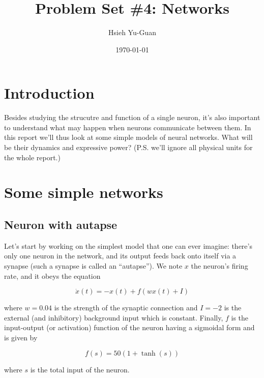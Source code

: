 

\pagestyle{fancy} 
\rfoot{\thepage}
\cfoot{}
\lfoot{~\theauthor}
\renewcommand{\headrulewidth}{0.4pt}
\renewcommand{\footrulewidth}{0.4pt}


\title{Problem Set \#4: Networks \vspace{-0.5em}}
\author{Hsieh Yu-Guan}
\date{\today}
\maketitle

\thispagestyle{fancy}

\section*{Introduction}

Besides studying the strucutre and function of a single neuron, it's also
important to understand what may happen when neurons communicate between them.
In this report we'll thus look at some simple models of neural networks.
What will be their dynamics and expressive power? 
(P.S. we'll ignore all physical units for the whole report.)

\section{Some simple networks}

\subsection{Neuron with autapse}

Let's start by working on the simplest model that one can ever imagine:
there's only one neuron in the network, and its output feeds back onto 
itself via a synapse (such a synapse is called an ``autapse''). 
We note $x$ the neuron's firing rate, and it obeys the equation

\[\dot{x}(t) = -x(t) + f(wx(t)+I)\]

\noindent
where $w = 0.04$ is the strength of the synaptic connection and $I = -2$ 
is the external (and inhibitory) background input which is constant.
Finally, $f$ is the input-output (or activation) function of the neuron having
a sigmoidal form and is given by

\[f(s) = 50(1 + \tanh(s))\]

\noindent
where $s$ is the total input of the neuron.

